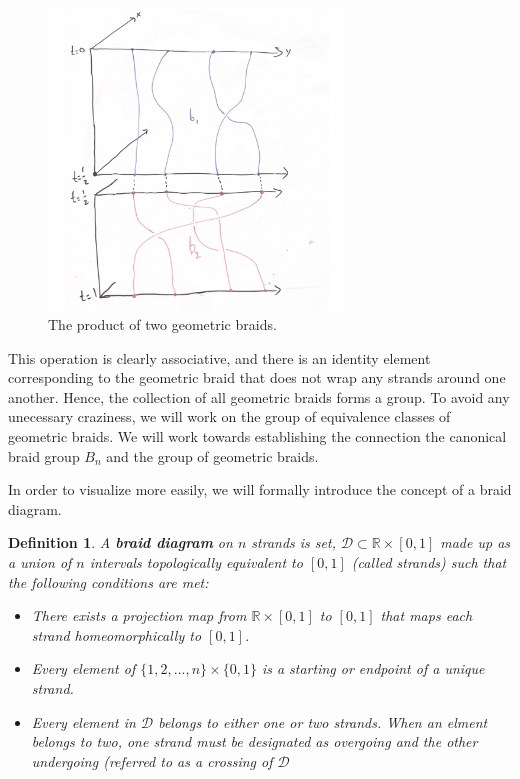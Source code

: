 \documentclass[10pt]{ucthesis}
\newcommand{\R}{\mathbb{R}}
\newtheorem{definition}{Definition}[chapter]
\begin{document}
\begin{figure}[H]
	\centering
	\includegraphics[width=0.7\textwidth]{geobraidprod.png}
	\caption{The product of two geometric braids.}
\end{figure}

This operation is clearly associative, and there is an identity element corresponding to the geometric braid that does not wrap any strands around one another. Hence, the collection of all geometric braids forms a group. To avoid any unecessary craziness, we will work on the group of equivalence classes of geometric braids. We will work towards establishing the connection the canonical braid group $B_n$ and the group of geometric braids.

In order to visualize more easily, we will formally introduce the concept of a braid diagram.

\begin{definition}
	A \textbf{braid diagram} on $n$ strands is set, $\mathcal{D}\subset \R\times [0,1]$ made up as a union of $n$ intervals topologically equivalent to $[0,1]$ (called strands) such that the following conditions are met:
\begin{itemize}
	\item There exists a projection map from $\R\times [0,1]$ to $[0,1]$ that maps each strand homeomorphically to $[0,1]$.
	\item Every element of $\{1,2,\hdots,n\}\times\{0,1\}$ is a starting or endpoint of a unique strand.
	\item Every element in $\mathcal{D}$ belongs to either one or two strands. When an elment belongs to two, one strand must be designated as overgoing and the other undergoing (referred to as a crossing of $\mathcal{D}$
\end{itemize}
\end{definition}
\end{document}
